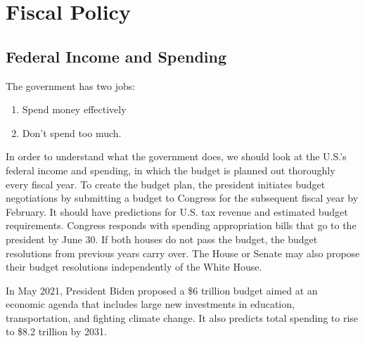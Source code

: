 \documentclass{article}
\begin{document}
\section{Fiscal Policy}

  \subsection{Federal Income and Spending}

    The government has two jobs: 
    \begin{enumerate}
      \item Spend money effectively 
      \item Don't spend too much. 
    \end{enumerate}

    In order to understand what the government does, we should look at the U.S.'s federal income and spending, in which the budget is planned out thoroughly every fiscal year. To create the budget plan, the president initiates budget negotiations by submitting a budget to Congress for the subsequent fiscal year by February. It should have predictions for U.S. tax revenue and estimated budget requirements. Congress responds with spending appropriation bills that go to the president by June 30. If both houses do not pass the budget, the budget resolutions from previous years carry over. The House or Senate may also propose their budget resolutions independently of the White House. 

    \begin{example}
      \label{ex:2021-biden-stimulus-package}
      In May 2021, President Biden proposed a \$6 trillion budget aimed at an economic agenda that includes large new investments in education, transportation, and fighting climate change. It also predicts total spending to rise to \$8.2 trillion by 2031.
    \end{example}
\end{document}
